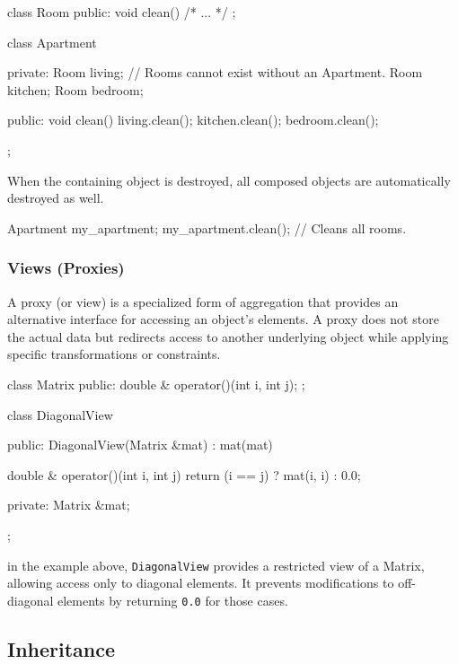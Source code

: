 \begin{codeblock}[language=C++, numbers=none]
class Room {
public:
    void clean() { /* ... */ }
};

class Apartment {
private:
    Room living;  // Rooms cannot exist without an Apartment.
    Room kitchen;
    Room bedroom;

public:
    void clean() { 
        living.clean(); 
        kitchen.clean(); 
        bedroom.clean(); 
    }
};
\end{codeblock}

\vspace{-0.5em}

When the containing object is destroyed, all composed objects are automatically destroyed as well.

\vspace{-0.5em}

\begin{codeblock}
Apartment my_apartment;
my_apartment.clean(); // Cleans all rooms.    
\end{codeblock}

\subsubsection{Views (Proxies)}

A proxy (or view) is a specialized form of aggregation that provides an alternative interface for accessing an object's elements. A proxy does not store the actual data but redirects access to another underlying object while applying specific transformations or constraints.

\begin{codeblock}[language=C++, numbers=none]
class Matrix {
public:
    double & operator()(int i, int j);
};

class DiagonalView {
public:
    DiagonalView(Matrix &mat) : mat(mat) {}

    double & operator()(int i, int j) {
        return (i == j) ? mat(i, i) : 0.0; 
    }

private:
    Matrix &mat;
};
\end{codeblock}

in the example above, \texttt{DiagonalView} provides a restricted view of a Matrix, allowing access only to diagonal elements. It prevents modifications to off-diagonal elements by returning \texttt{0.0} for those cases.

\subsection{Inheritance}

